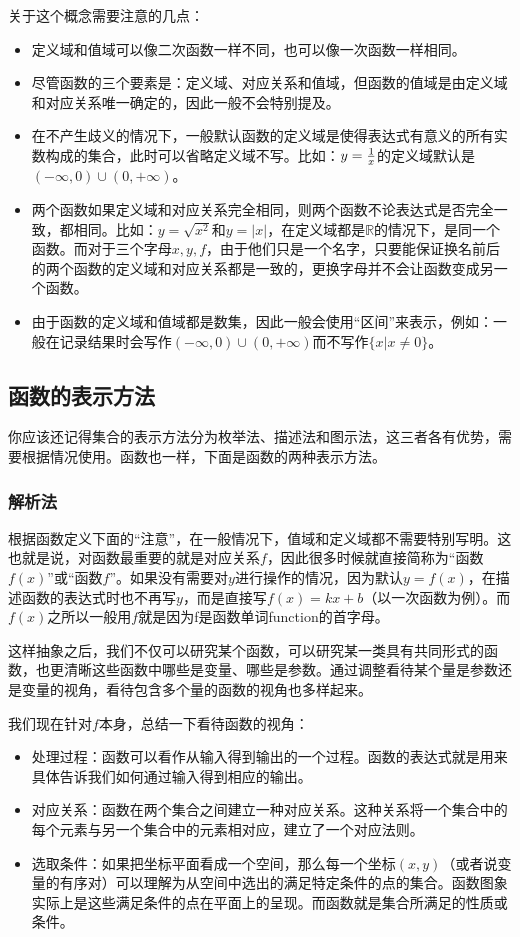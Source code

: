 关于这个概念需要注意的几点：
\begin{itemize}
\item 定义域和值域可以像二次函数一样不同，也可以像一次函数一样相同。
\item 尽管函数的三个要素是：定义域、对应关系和值域，但函数的值域是由定义域和对应关系唯一确定的，因此一般不会特别提及。
\item 在不产生歧义的情况下，一般默认函数的定义域是使得表达式有意义的所有实数构成的集合，此时可以省略定义域不写。比如：$y={1\over x}$的定义域默认是$(-\infty,0)\cup(0,+\infty)$。
\item 两个函数如果定义域和对应关系完全相同，则两个函数不论表达式是否完全一致，都相同。比如：$y=\sqrt{x^2}$和$y=|x|$，在定义域都是$\mathbb R$的情况下，是同一个函数。而对于三个字母$x,y,f$，由于他们只是一个名字，只要能保证换名前后的两个函数的定义域和对应关系都是一致的，更换字母并不会让函数变成另一个函数。
\item 由于函数的定义域和值域都是数集，因此一般会使用“区间”来表示，例如：一般在记录结果时会写作$(-\infty,0)\cup(0,+\infty)$而不写作$\{x|x\neq0\}$。
\end{itemize}

\subsection{函数的表示方法}

你应该还记得集合的表示方法分为枚举法、描述法和图示法，这三者各有优势，需要根据情况使用。函数也一样，下面是函数的两种表示方法。

\subsubsection{解析法}

根据函数定义下面的“注意”，在一般情况下，值域和定义域都不需要特别写明。这也就是说，对函数最重要的就是对应关系$f$，因此很多时候就直接简称为“函数$f(x)$”或“函数$f$”。如果没有需要对$y$进行操作的情况，因为默认$y=f(x)$，在描述函数的表达式时也不再写$y$，而是直接写$f(x)=kx+b$（以一次函数为例）。而$f(x)$之所以一般用$f$就是因为f是函数单词function的首字母。

这样抽象之后，我们不仅可以研究某个函数，可以研究某一类具有共同形式的函数，也更清晰这些函数中哪些是变量、哪些是参数。通过调整看待某个量是参数还是变量的视角，看待包含多个量的函数的视角也多样起来。

我们现在针对$f$本身，总结一下看待函数的视角：

\begin{itemize}
\item 处理过程：函数可以看作从输入得到输出的一个过程。函数的表达式就是用来具体告诉我们如何通过输入得到相应的输出。
\item 对应关系：函数在两个集合之间建立一种对应关系。这种关系将一个集合中的每个元素与另一个集合中的元素相对应，建立了一个对应法则。
\item 选取条件：如果把坐标平面看成一个空间，那么每一个坐标$(x,y)$（或者说变量的有序对）可以理解为从空间中选出的满足特定条件的点的集合。函数图象实际上是这些满足条件的点在平面上的呈现。而函数就是集合所满足的性质或条件。
\end{itemize}


